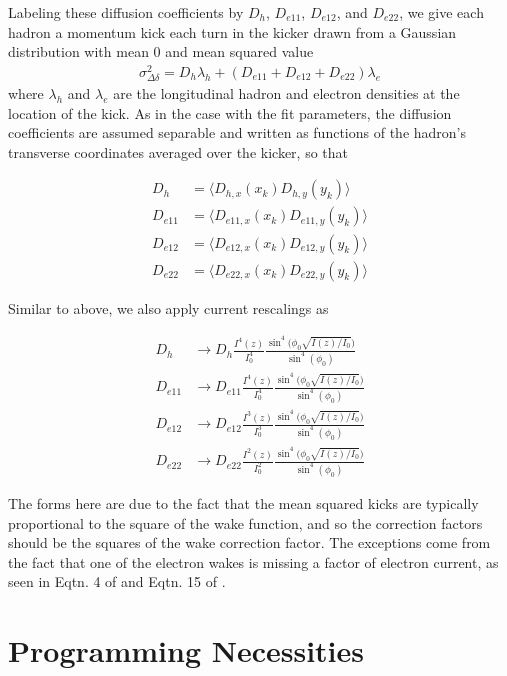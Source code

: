\documentclass[letterpaper,11pt]{article}
\begin{document}
Labeling these diffusion coefficients by $D_h$, $D_{e11}$, $D_{e12}$, and $D_{e22}$, we give each hadron a momentum kick each turn in the kicker drawn from a Gaussian distribution with mean $0$ and mean squared value 
\begin{align}\label{eqtn:cec_diff}
	\sigma_{\Delta\delta}^2 = D_h\lambda_h + (D_{e11} + D_{e12} + D_{e22})\lambda_e
\end{align}
\noindent
where $\lambda_h$ and $\lambda_e$ are the longitudinal hadron and electron densities at the location of the kick. As in the case with the fit parameters, the diffusion coefficients are assumed separable and written as functions of the hadron's transverse coordinates averaged over the kicker, so that 

\begin{align}\label{eqtn:cec_diff_avg}
	D_h &= \langle D_{h,x}(x_k) D_{h,y}(y_k)\rangle\\\nonumber
	D_{e11} &= \langle D_{e11,x}(x_k) D_{e11,y}(y_k)\rangle\\\nonumber
	D_{e12} &= \langle D_{e12,x}(x_k) D_{e12,y}(y_k)\rangle\\\nonumber
	D_{e22} &= \langle D_{e22,x}(x_k) D_{e22,y}(y_k)\rangle
\end{align}

Similar to above, we also apply current rescalings as 

\begin{align}
	D_h &\rightarrow D_h \frac{I^4(z)}{I_0^4}\frac{\sin^4\big(\phi_0\sqrt{I(z)/I_0}\big)}{\sin^4(\phi_0)}\\\nonumber
	D_{e11} &\rightarrow D_{e11}\frac{I^4(z)}{I_0^4}\frac{\sin^4\big(\phi_0\sqrt{I(z)/I_0}\big)}{\sin^4(\phi_0)}\\\nonumber
	D_{e12} &\rightarrow D_{e12}\frac{I^3(z)}{I_0^3}\frac{\sin^4\big(\phi_0\sqrt{I(z)/I_0}\big)}{\sin^4(\phi_0)}\\\nonumber
	D_{e22} &\rightarrow D_{e22}\frac{I^2(z)}{I_0^2}\frac{\sin^4\big(\phi_0\sqrt{I(z)/I_0}\big)}{\sin^4(\phi_0)}
\end{align}

The forms here are due to the fact that the mean squared kicks are typically proportional to the square of the wake function, and so the correction factors should be the squares of the wake correction factor. The exceptions come from the fact that one of the electron wakes is missing a factor of electron current, as seen in Eqtn. 4 of \cite{cite:ipac2021} and Eqtn. 15 of \cite{cite:e_noise_arxiv}.


\section{Programming Necessities}
\end{document}
